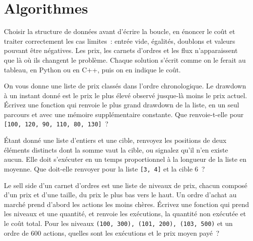 \chapter{Algorithmes}\label{ch:iv3:algorithms}

\begin{ivtrains}
Choisir la structure de données avant d'écrire la boucle, en énoncer le coût et traiter correctement les cas limites~: entrée vide, égalités, doublons et valeurs pouvant être négatives. Les prix, les carnets d'ordres et les flux n'apparaissent que là où ils changent le problème. Chaque solution s'écrit comme on le ferait au tableau, en Python ou en C++, puis on en indique le coût.
\end{ivtrains}

\begin{question}\label{iq:iv3:algorithms:1}
On vous donne une liste de prix classés dans l'ordre chronologique. Le drawdown à un instant donné est le prix le plus élevé observé jusque-là moins le prix actuel. Écrivez une fonction qui renvoie le plus grand drawdown de la liste, en un seul parcours et avec une mémoire supplémentaire constante. Que renvoie-t-elle pour \texttt{[100, 120, 90, 110, 80, 130]}~?
\end{question}

\begin{question}\label{iq:iv3:algorithms:2}
Étant donné une liste d'entiers et une cible, renvoyez les positions de deux éléments distincts dont la somme vaut la cible, ou signalez qu'il n'en existe aucun. Elle doit s'exécuter en un temps proportionnel à la longueur de la liste en moyenne. Que doit-elle renvoyer pour la liste \texttt{[3, 4]} et la cible 6~?
\end{question}

\begin{question}\label{iq:iv3:algorithms:3}
Le sell side d'un carnet d'ordres est une liste de niveaux de prix, chacun composé d'un prix et d'une taille, du prix le plus bas vers le haut. Un ordre d'achat au marché prend d'abord les actions les moins chères. Écrivez une fonction qui prend les niveaux et une quantité, et renvoie les exécutions, la quantité non exécutée et le coût total. Pour les niveaux \texttt{(100, 300), (101, 200), (103, 500)} et un ordre de 600 actions, quelles sont les exécutions et le prix moyen payé~?
\end{question}

